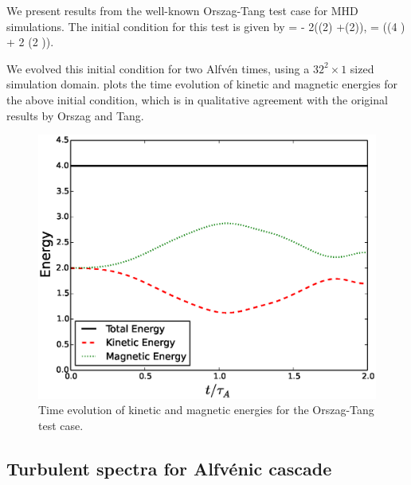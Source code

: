     We present results from the well-known Orszag-Tang test case \cite{orszag79} for MHD
    simulations. The initial condition for this test is given by
    \beq
        \Phi = - 2\lt(\cos \lt(2\pi{}\rt) +\cos\lt(2\pi{}\rt)\rt),
    \eeq
    \beq
        \Psi = \lt(\cos\lt(4 \pi {}\rt) + 2 \cos\lt(2 \pi
        \rt)\rt).
    \eeq

    We evolved this initial condition for two Alfv\'{e}n times, using a $32^2\times 1$
    sized simulation domain.  plots the time evolution of kinetic and magnetic
    energies for the above initial condition, which is in qualitative agreement with the
    original results by Orszag and Tang. 

        \begin{figure}
            \includegraphics[width=14.8cm]{figs/gandalf/OT_energy.eps}
            \caption{Time evolution of kinetic and magnetic energies for the Orszag-Tang
            test case.}
            \label{gandalf:fig:OTenergy}
        \end{figure}

    \subsection{Turbulent spectra for Alfv\'{e}nic cascade}
    
